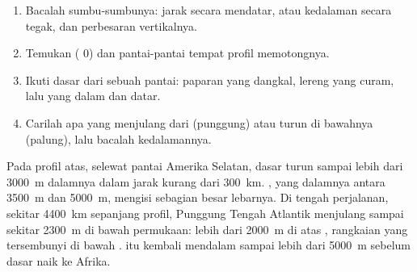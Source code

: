 \begin{method}
\begin{enumerate}
  \item Bacalah sumbu-sumbunya: jarak secara mendatar,  atau
        kedalaman secara tegak, dan perbesaran vertikalnya.
  \item Temukan  ( 0) dan pantai-pantai tempat
        profil memotongnya.
  \item Ikuti dasar  dari sebuah pantai: paparan yang dangkal, lereng
        yang curam, lalu  yang dalam dan datar.
  \item Carilah apa yang menjulang dari  (punggung) atau turun di
        bawahnya (palung), lalu bacalah kedalamannya.
\end{enumerate}
\end{method}

\begin{example}
Pada profil atas, selewat pantai Amerika Selatan, dasar  turun sampai
lebih dari \qty{3000}{m} dalamnya dalam jarak kurang dari \qty{300}{km}.
, yang dalamnya antara \qty{3500}{m} dan \qty{5000}{m},
mengisi sebagian besar lebarnya. Di tengah perjalanan, sekitar
\qty{4400}{km} sepanjang profil, Punggung Tengah Atlantik menjulang sampai
sekitar \qty{2300}{m} di bawah permukaan: lebih dari \qty{2000}{m} di
atas , rangkaian  yang tersembunyi di bawah . 
itu kembali mendalam sampai lebih dari \qty{5000}{m} sebelum dasar 
naik ke Afrika.
\end{example}

